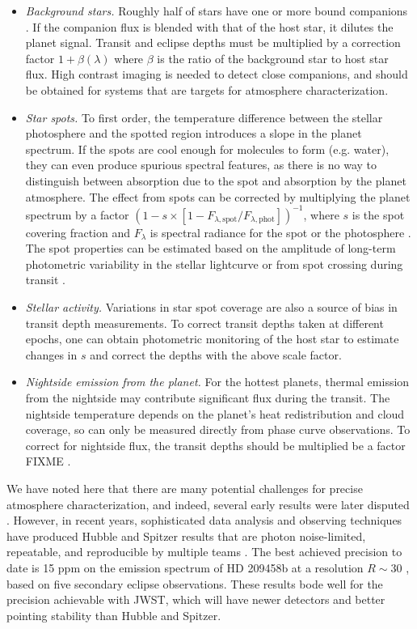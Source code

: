 \documentclass[graybox,natbib,nosecnum]{svmult}
\begin{document}
\begin{itemize}
\item{\emph{Background stars.} Roughly half of stars have one or more bound companions \citep{raghavan10}. If the companion flux is blended with that of the host star, it dilutes the planet signal. Transit and eclipse depths must be multiplied by a correction factor $1 + \beta(\lambda)$ where $\beta$ is the ratio of the background star to host star flux. High contrast imaging is needed to detect close companions, and should be obtained for systems that are targets for atmosphere characterization.}
\item{\emph{Star spots.} To first order, the temperature difference between the stellar photosphere and the spotted region introduces a slope in the planet spectrum. If the spots are cool enough for molecules to form (e.g. water), they can even produce spurious spectral features, as there is no way to distinguish between absorption due to the spot and absorption by the planet atmosphere. The effect from spots can be corrected by multiplying the planet spectrum by a factor $(1-s\times[1-F_{\lambda,\mathrm{spot}}/F_{\lambda,\mathrm{phot}}])^{-1}$, where $s$ is the spot covering fraction and $F_\lambda$ is spectral radiance for the spot or the photosphere \citep{mccullough14}. The spot properties can be estimated based on the amplitude of long-term photometric variability in the stellar lightcurve or from spot crossing during transit \citep[e.g.][]{pont08}.} 
\item{\emph{Stellar activity.} Variations in star spot coverage are also a source of bias in transit depth measurements. To correct transit depths taken at different epochs, one can obtain photometric monitoring of the host star to estimate changes in $s$ and correct the depths with the above scale factor.} 
\item{\emph{Nightside emission from the planet.} For the hottest planets, thermal emission from the nightside may contribute significant flux during the transit. The nightside temperature depends on the planet's heat redistribution and cloud coverage, so can only be measured directly from phase curve observations. To correct for nightside flux, the transit depths should be multiplied be a factor FIXME \citep{kipping10}.} 
\end{itemize}

We have noted here that there are many potential challenges for precise atmosphere characterization, and indeed, several early results were later disputed \citep[e.g.][]{tinetti07, swain08, gibson11}. However, in recent years, sophisticated data analysis and observing techniques have produced Hubble and Spitzer results that are photon noise-limited, repeatable, and reproducible by multiple teams \citep[e.g.][]{deming13, kreidberg14a, ingalls16}. The best achieved precision to date is 15 ppm on the emission spectrum of HD 209458b at a resolution $R\sim 30$ \citep{line16}, based on five secondary eclipse observations. These results bode well for the precision achievable with JWST, which will have newer detectors and better pointing stability than Hubble and Spitzer.
\end{document}
